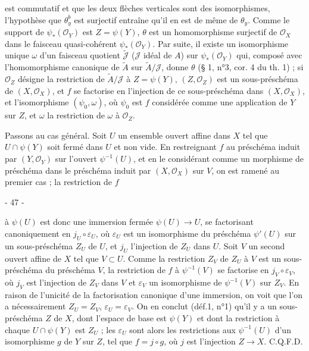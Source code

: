 est commutatif et que les deux flèches verticales sont des isomorphismes, l'hypothèse que $\theta_y^b$ est surjectif entraîne qu'il en est de même de $\theta_y$. Comme le support de $\psi_*(\mathcal{O}_Y)$ est $Z = \psi(Y)$, $\theta$ est un homomorphisme surjectif de $\mathcal{O}_X$ dans le faisceau quasi-cohérent $\psi_*(\mathcal{O}_Y)$. Par suite, il existe un isomorphisme unique $\omega$ d'un faisceau quotient $\tilde{\mathcal{J}}$ ($\mathcal{J}$ idéal de $A$) sur $\psi_*(\mathcal{O}_Y)$ qui, composé avec l'homomorphisme canonique de $\tilde{A}$ sur $\tilde{A}/\mathcal{J}$, donne $\theta$ (§ 1, n°3, cor. 4 du th. 1) ; si $\mathcal{O}_Z$ désigne la restriction de $\tilde{A}/\mathcal{J}$ à $Z = \psi(Y)$, $(Z, \mathcal{O}_Z)$ est un sous-préschéma de $(X, \mathcal{O}_X)$, et $f$ se factorise en l'injection de ce sous-préschéma dans $(X, \mathcal{O}_X)$, et l'isomorphisme $(\psi_0, \omega)$, où $\psi_0$ est $f$ considérée comme une application de $Y$ sur $Z$, et $\omega$ la restriction de $\omega$ à $\mathcal{O}_Z$.

Passons au cas général. Soit $U$ un ensemble ouvert affine dans $X$ tel que $U \cap \psi(Y)$ soit fermé dans $U$ et non vide. En restreignant $f$ au préschéma induit par $(Y, \mathcal{O}_Y)$ sur l'ouvert $\psi^{-1}(U)$, et en le considérant comme un morphisme de préschéma dans le préschéma induit par $(X, \mathcal{O}_X)$ sur $V$, on est ramené au premier cas ; la restriction de $f$

\newpage


- 47 -

à $\psi(U)$ est donc une immersion fermée $\psi(U) \to U$, se factorisant canoniquement en $j_U \circ \varepsilon_U$, où $\varepsilon_U$ est un isomorphisme du préschéma $\psi'(U)$ sur un sous-préschéma $Z_U$ de $U$, et $j_U$ l'injection de $Z_U$ dans $U$. Soit $V$ un second ouvert affine de $X$ tel que $V \subset U$. Comme la restriction $Z_V$ de $Z_U$ à $V$ est un sous-préschéma du préschéma $V$, la restriction de $f$ à $\psi^{-1}(V)$ se factorise en $j_V \circ \varepsilon_V$, où $j_V$ est l'injection de $Z_V$ dans $V$ et $\varepsilon_V$ un isomorphisme de $\psi^{-1}(V)$ sur $Z_V$. En raison de l'unicité de la factorisation canonique d'une immersion, on voit que l'on a nécessairement $Z_U = Z_V$, $\varepsilon_U = \varepsilon_V$. On en conclut (déf.1, n°1) qu'il y a un sous-préschéma $Z$ de $X$, dont l'espace de base est $\psi(Y)$ et dont la restriction à chaque $U \cap \psi(Y)$ est $Z_U$ ; les $\varepsilon_U$ sont alors les restrictions aux $\psi^{-1}(U)$ d'un isomorphisme $g$ de $Y$ sur $Z$, tel que $f = j \circ g$, où $j$ est l'injection $Z \to X$. C.Q.F.D.

